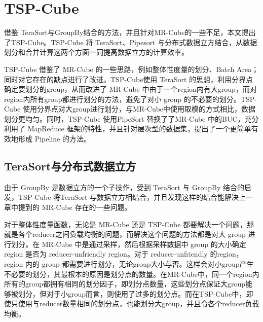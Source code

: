 \section{TSP-Cube}

借鉴 TeraSort与GroupBy结合的方法，并且针对MR-Cube的一些不足，本文提出了TSP-Cube。TSP-Cube 将 TeraSort、Pipesort 与分布式数据立方结合，从数据划分和合并计算这两个方面一同提高数据立方的计算效率。

TSP-Cube 借鉴了 MR-Cube 的一些思路，例如整体性度量的划分、Batch Area；同时对它存在的缺点进行了改进。TSP-Cube使用 TeraSort 的思想，利用分界点确定要划分的group，从而改进了 MR-Cube 中由于一个region内有大group，而对region内所有group都进行划分的方法，避免了对小 group 的不必要的划分。TSP-Cube 使用分界点对大group进行划分，与MR-Cube中使用取模的方式相比，数据划分更均匀。同时，TSP-Cube 使用PipeSort 替换了了MR-Cube 中的BUC，充分利用了 MapReduce 框架的特性，并且针对层次型的数据集，提出了一个更简单有效地形成 Pipeline 的方法。

\subsection{TeraSort与分布式数据立方}


由于 GroupBy 是数据立方的一个子操作，受到 TeraSort 与 GroupBy 结合的启发，TSP-Cube 将TeraSort 与数据立方相结合，并且发现这样的结合能解决上一章中提到的 MR-Cube 存在的一些问题。



对于整体性度量函数，无论是 MR-Cube 还是 TSP-Cube 都要解决一个问题，那就是各个reducer之间负载均衡的问题，而解决这个问题的方法都是对大 group 进行划分。在 MR-Cube 中是通过采样，然后根据采样数据中 group 的大小确定 region 是否为 reducer-unfriendly region。对于 reducer-unfriendly 的region，region 内的 group 都需要进行划分，无论group大小与否。这样会对小group产生不必要的划分，其最根本的原因是划分点的数量。在MR-Cube中，同一个region内所有的group都拥有相同的划分因子，即划分点数量，这些划分点保证大group能够被划分，但对于小group而言，则使用了过多的划分点。而在TSP-Cube中，即使只使用与reducer数量相同的划分点，也能划分大group，并且令各个reducer负载均衡。

